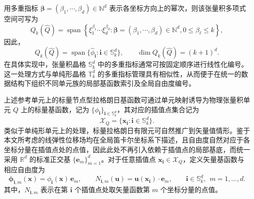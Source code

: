 用多重指标 $\boldsymbol{\beta} = (\beta_1,\cdots,\beta_d)\in\mathbb{N}^d$ 表示各坐标方向上的幂次，则该张量积多项式空间可写为
\[
Q_k(\hat{Q}) = \operatorname{span}\left\{
\xi_1^{\beta_1}\cdots\xi_d^{\beta_d}:\boldsymbol{\beta} = (\beta_1,\cdots,\beta_d)\in\mathbb{N}^d,0\leq\beta_\ell\leq{k}
\right\},
\]
因此，
\[
Q_k(\hat Q) = \operatorname{span}\{\hat{\phi}_{\boldsymbol{i}}:\boldsymbol{i}\in\mathbb{S}_k^d\}, \qquad \dim Q_k(\hat Q)=(k+1)^d.
\]
在具体实现中，张量积晶格 $\mathbb{S}_k^d$ 中的多重指标通常可按固定顺序进行线性化编号。这一处理方式与单纯形晶格 $\mathbb{T}_k^d$ 的多重指标管理具有相似性，从而便于在统一的数据结构下组织不同单元族的局部基函数索引及全局自由度编号。

%

上述参考单元上的标量节点型拉格朗日基函数可通过单元映射诱导为物理张量积单元 $Q$ 上的标量基函数，记为 $\{\phi_{\boldsymbol{i}}\}_{\boldsymbol{i}\in\mathbb{S}_k^d}$，其对应的插值点集合记为
\[
\mathcal{X}_Q=\{\boldsymbol{x}_{\boldsymbol{i}}:\boldsymbol{i}\in\mathbb{S}_k^d\}.
\]
类似于单纯形单元上的处理，标量拉格朗日有限元可自然推广到矢量值情形。鉴于本文所考虑的线弹性位移场均在全局笛卡尔坐标系下描述，且自由度自然对应于各坐标分量在插值点处的点值，因此此处不再引入依赖于插值点的局部基底，而统一采用 $\mathbb{R}^d$ 的标准正交基 $\{\boldsymbol{e}_m\}_{m=1}^d$。对于任意插值点 $\boldsymbol{x}_{\boldsymbol{i}}\in\mathcal{X}_Q$，定义矢量基函数与相应自由度为
\[
\boldsymbol{\phi}_{\boldsymbol{i},m}(\boldsymbol{x}) = \phi_{\boldsymbol{i}}(\boldsymbol{x})\,\boldsymbol{e}_m, \qquad N_{\boldsymbol{i},m}(\boldsymbol{u}) = \boldsymbol{u}(\boldsymbol{x}_{\boldsymbol{i}})\cdot\boldsymbol{e}_m, \qquad \boldsymbol{i}\in\mathbb{S}_k^d,\ \ m=1,\dots,d.
\]
其中，$N_{\boldsymbol{i},m}$ 表示在第 $\boldsymbol{i}$ 个插值点处取矢量函数第 $m$ 个坐标分量的点值。

